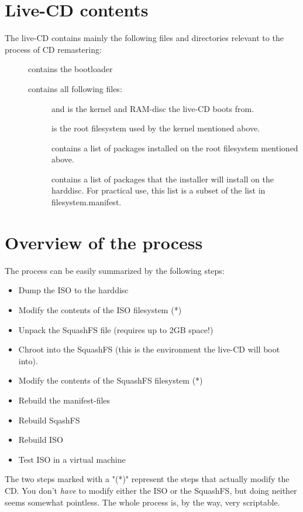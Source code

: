 \section{Live-CD contents}
The \tunix live-CD contains mainly the following files and directories relevant
to the process of CD remastering:
\begin{description}
  \item[] contains the bootloader
  \item[] contains all following files:
  \begin{description}
    \item[] and \textbf{} is the kernel and RAM-disc
      the live-CD boots from.
    \item[] is the root filesystem used by the kernel
      mentioned above.
    \item[] contains a list of packages installed on the
      root filesystem mentioned above.
    \item[] contains a list of packages that the
      installer will install on the harddisc. For practical use, this list is a
      subset of the list in filesystem.manifest.
  \end{description}
\end{description}

\section{Overview of the process}
The process can be easily summarized by the following steps:
\begin{itemize}
  \item Dump the ISO to the harddisc
  \item Modify the contents of the ISO filesystem (*)
  \item Unpack the SquashFS file (requires up to 2GB space!)
  \item Chroot into the SquashFS (this is the environment the live-CD will boot
    into).
  \item Modify the contents of the SquashFS filesystem (*)
  \item Rebuild the manifest-files
  \item Rebuild SqashFS
  \item Rebuild ISO
  \item Test ISO in a virtual machine
\end{itemize}
The two steps marked with a "(*)" represent the steps that actually modify the
CD. You don't \emph{have} to modify either the ISO or the SquashFS, but doing
neither seems somewhat pointless. The whole process is, by the way, very
scriptable.


